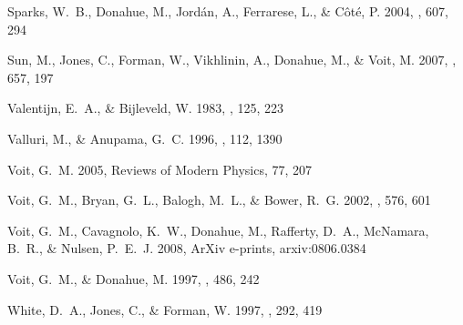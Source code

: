 \documentclass[12pt,preprint]{aastex}
\begin{document}
\begin{thebibliography}{}
{Sparks}, W.~B., {Donahue}, M., {Jord{\'a}n}, A., {Ferrarese}, L., \&
  {C{\^o}t{\'e}}, P. 2004, \apj, 607, 294

{Sun}, M., {Jones}, C., {Forman}, W., {Vikhlinin}, A., {Donahue}, M., \&
  {Voit}, M. 2007, \apj, 657, 197

{Valentijn}, E.~A., \& {Bijleveld}, W. 1983, \aap, 125, 223

{Valluri}, M., \& {Anupama}, G.~C. 1996, \aj, 112, 1390

{Voit}, G.~M. 2005, Reviews of Modern Physics, 77, 207

{Voit}, G.~M., {Bryan}, G.~L., {Balogh}, M.~L., \& {Bower}, R.~G. 2002, \apj,
  576, 601

{Voit}, G.~M., {Cavagnolo}, K.~W., {Donahue}, M., {Rafferty}, D.~A., 
  {McNamara}, B.~R., \& {Nulsen}, P.~E.~J. 2008, ArXiv e-prints, arxiv:0806.0384

{Voit}, G.~M., \& {Donahue}, M. 1997, \apj, 486, 242

{White}, D.~A., {Jones}, C., \& {Forman}, W. 1997, \mnras, 292, 419

\end{thebibliography}
\end{document}
